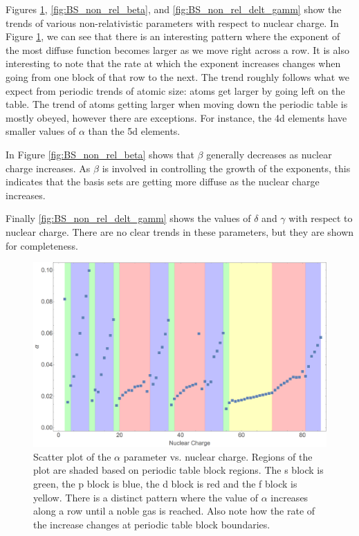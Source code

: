 Figures \ref{fig:BS_non_rel_alpha}, \ref{fig:BS_non_rel_beta}, and \ref{fig:BS_non_rel_delt_gamm} show the trends of various non-relativistic parameters with respect to nuclear charge. In Figure  \ref{fig:BS_non_rel_alpha}, we can see that there is an interesting pattern where the exponent of the most diffuse function becomes larger as we move right across a row. It is also interesting to note that the rate at which the exponent increases changes when going from one block of that row to the next. The trend roughly follows what we expect from periodic trends of atomic size: atoms get larger by going left on the table. The trend of atoms getting larger when moving down the periodic table is mostly obeyed, however there are exceptions. For instance, the 4d elements have smaller values of $\alpha$ than the 5d elements.

In Figure \ref{fig:BS_non_rel_beta} shows that $\beta$ generally decreases as nuclear charge increases. As $\beta$ is involved in controlling the growth of the exponents, this indicates that the basis sets are getting more diffuse as the nuclear charge increases.

Finally \ref{fig:BS_non_rel_delt_gamm} shows the values of $\delta$ and $\gamma$ with respect to nuclear charge. There are no clear trends in these parameters, but they are shown for completeness.

\begin{figure}
\center
\includegraphics[width=1\textwidth]{Figures/BS_non_rel_alpha.png}
\caption[Scatter plot of the $\alpha$ parameter vs. nuclear charge.]
{Scatter plot of the $\alpha$ parameter vs. nuclear charge. Regions of the plot are shaded based on periodic table block regions. The s block is green, the p block is blue, the d block is red and the f block is yellow. There is a distinct pattern where the value of $\alpha$ increases along a row until a noble gas is reached. Also note how the rate of the increase changes at periodic table block boundaries.}
\label{fig:BS_non_rel_alpha}
\end{figure}

